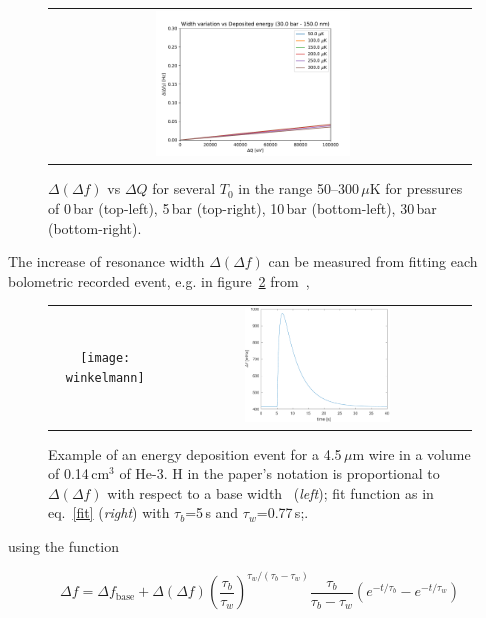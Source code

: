 \documentclass[a4paper,10pt]{article}
\begin{document}
\begin{figure}[!ht]
\begin{center}
\begin{tabular}{cc}
    \includegraphics[width=0.49\textwidth]{DeltaDeltaW_vs_DE-30bar}
  \end{tabular}
  \end{center}
  \caption{$\Delta(\Delta f)$ vs $\Delta Q$ for several $T_0$ in the range 50--300\,$\mu$K for pressures of 0\,bar (top-left), 5\,bar (top-right), 10\,bar (bottom-left), 30\,bar (bottom-right).}
  \label{fig:DeltaDeltaWvsDE}
\end{figure}

The increase of resonance width $\Delta (\Delta f)$ can be measured from fitting each bolometric recorded event, e.g. in figure~\ref{fig:winkelmann} from~\cite{winkelmann},
\begin{figure}[!ht]
  \begin{center}
    \begin{tabular}{cc}
    \texttt{[image: winkelmann]} &
    \includegraphics[width=0.49\textwidth]{winkelmann_fit.pdf}
    \label{fig:winkelmann}
    \end{tabular}
  \end{center}
 \caption{Example of an energy deposition event for a 4.5\,$\mu$m wire in a volume of 0.14\,cm$^3$ of He-3. H in the paper's notation is proportional to $\Delta (\Delta f)$ with respect to a base width~\cite{winkelmann} (\textit{left}); fit function as in eq.~\ref{fit} (\textit{right}) with $\tau_b$=5\,s and $\tau_w$=0.77\,s;.}
\end{figure}
using the function

\begin{equation}
  \Delta f = \Delta f_\mathrm{base} + \Delta (\Delta f) {\left( \frac{\tau_b}{\tau_w} \right)}^{\tau_w/(\tau_b-\tau_w)} \frac{\tau_b}{\tau_b - \tau_w} \left( e^{-t/\tau_b} - e^{-t/\tau_w} \right)
\label{fit}
\end{equation}
\end{document}
